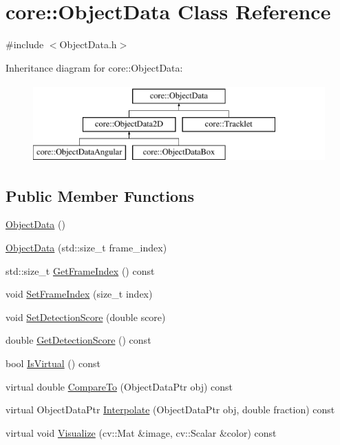 \hypertarget{classcore_1_1ObjectData}{}\section{core\+:\+:Object\+Data Class Reference}
\label{classcore_1_1ObjectData}


{\ttfamily \#include $<$Object\+Data.\+h$>$}

Inheritance diagram for core\+:\+:Object\+Data\+:\begin{figure}[H]
\begin{center}
\leavevmode
\includegraphics[height=3.000000cm]{classcore_1_1ObjectData}
\end{center}
\end{figure}
\subsection*{Public Member Functions}
\begin{DoxyCompactItemize}
\item 
\hyperlink{classcore_1_1ObjectData_a7f47a396a3b9e8c12a1557c8156b8ff9}{Object\+Data} ()
\item 
\hyperlink{classcore_1_1ObjectData_af4333a52b012841a6ba73b25aeaae71b}{Object\+Data} (std\+::size\+\_\+t frame\+\_\+index)
\item 
std\+::size\+\_\+t \hyperlink{classcore_1_1ObjectData_a10841283bb6caeda5960624a8cac7fb1}{Get\+Frame\+Index} () const 
\item 
void \hyperlink{classcore_1_1ObjectData_aedfe00fa37d5ac7ef554bda746931148}{Set\+Frame\+Index} (size\+\_\+t index)
\item 
void \hyperlink{classcore_1_1ObjectData_a737216c2689aefa216c1c842922d7dd8}{Set\+Detection\+Score} (double score)
\item 
double \hyperlink{classcore_1_1ObjectData_a2ba882067c6e7abea2b45308405b0c07}{Get\+Detection\+Score} () const 
\item 
bool \hyperlink{classcore_1_1ObjectData_af12675e4c93aa4559b7e11c4ab88ad54}{Is\+Virtual} () const 
\item 
virtual double \hyperlink{classcore_1_1ObjectData_adcd9fc0dfa93d45668e667237f249553}{Compare\+To} (Object\+Data\+Ptr obj) const 
\item 
virtual Object\+Data\+Ptr \hyperlink{classcore_1_1ObjectData_a7b8943b13c2c2ce2dfaacb2b98c8f30c}{Interpolate} (Object\+Data\+Ptr obj, double fraction) const 
\item 
virtual void \hyperlink{classcore_1_1ObjectData_a505eb948f5d857b86f4f452bb39053b9}{Visualize} (cv\+::\+Mat \&image, cv\+::\+Scalar \&color) const 
\end{DoxyCompactItemize}
